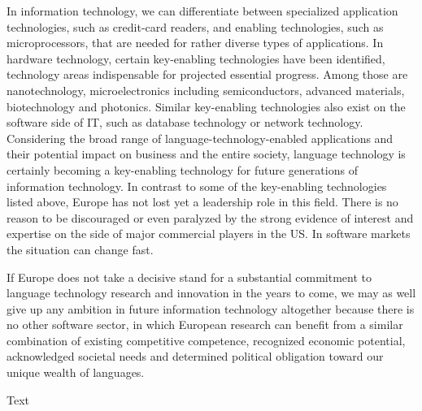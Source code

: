 \begin{multicols}{2}
In information technology, we can differentiate between specialized application technologies, such as credit-card readers, and enabling tech­nologies, such as microprocessors, that are needed for rather diverse types of applications. In hardware technology, certain key-enabling technologies have been identified, technology areas indispensable for projected essential progress. Among those are nanotechnology, microelectronics including semiconductors, advanced materials, biotechnology and photonics. Similar key-enabling technologies also exist on the software side of IT, such as database technology or network technology. Considering the broad range of language-technology-enabled applications and their potential impact on business and the entire society, language technology is certainly becoming a key-enabling technology for future generations of information technology. In contrast to some of the key-enabling technologies listed above, Europe has not lost yet a leadership role in this field. There is no reason to be discouraged or even paralyzed by the strong evidence of interest and expertise on the side of major commercial players in the US. In software markets the situation can change fast.
 
If Europe does not take a decisive stand for a substantial commitment to language technology research and innovation in the years to come, we may as well give up any ambition in future information technology altogether because there is no other software sector, in which European research can benefit from a similar combination of existing competitive competence, recognized economic potential, acknowledged societal needs and determined political obligation toward our unique wealth of languages.

\end{multicols}


\begin{multicols}{2}
Text
\end{multicols}


\cleardoublepage



